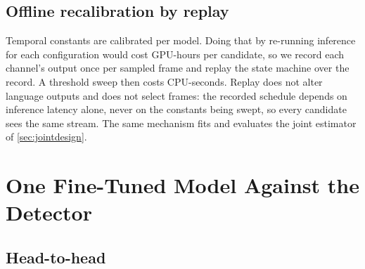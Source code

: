 \documentclass[journal]{IEEEtran}
\begin{document}
\subsection{Offline recalibration by replay}
Temporal constants are calibrated per model.  Doing that by re-running inference for each configuration would cost GPU-hours per candidate, so we record each channel's output once per sampled frame and replay the state machine over the record.  A threshold sweep then costs CPU-seconds.  Replay does not alter language outputs and does not select frames: the recorded schedule depends on inference latency alone, never on the constants being swept, so every candidate sees the same stream.  The same mechanism fits and evaluates the joint estimator of \cref{sec:jointdesign}.

\section{One Fine-Tuned Model Against the Detector}
\label{sec:results}

\subsection{Head-to-head}
\label{sec:vsdetector}
\end{document}
